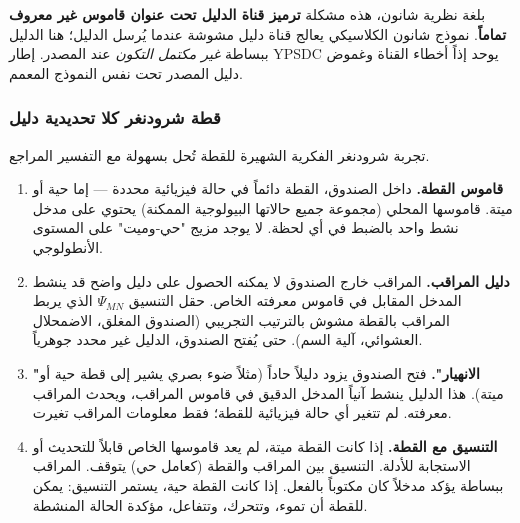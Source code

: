 \documentclass[12pt,a4paper]{article}
\theoremstyle{remark}
\begin{document}
	بلغة نظرية شانون، هذه مشكلة \textbf{ترميز قناة الدليل تحت عنوان قاموس غير معروف تماماً}. نموذج شانون الكلاسيكي يعالج قناة دليل مشوشة عندما يُرسل الدليل؛ هنا الدليل ببساطة \emph{غير مكتمل التكون} عند المصدر. إطار YPSDC يوحد إذاً أخطاء القناة وغموض دليل المصدر تحت نفس النموذج المعمم.
	
	\medskip
	
	\subsubsection{قطة شرودنغر كلا تحديدية دليل}
	
	تجربة شرودنغر الفكرية الشهيرة للقطة تُحل بسهولة مع التفسير المراجع.
	
	\begin{enumerate}[leftmargin=*]
		\item \textbf{قاموس القطة.} داخل الصندوق، القطة دائماً في حالة فيزيائية محددة — إما حية أو ميتة. قاموسها المحلي (مجموعة جميع حالاتها البيولوجية الممكنة) يحتوي على مدخل نشط واحد بالضبط في أي لحظة. لا يوجد مزيج "حي‑وميت" على المستوى الأنطولوجي.
		
		\item \textbf{دليل المراقب.} المراقب خارج الصندوق لا يمكنه الحصول على دليل واضح قد ينشط المدخل المقابل في قاموس معرفته الخاص. حقل التنسيق \(\Psi_{MN}\) الذي يربط المراقب بالقطة مشوش بالترتيب التجريبي (الصندوق المغلق، الاضمحلال العشوائي، آلية السم). حتى يُفتح الصندوق، الدليل غير محدد جوهرياً.
		
		\item \textbf{"الانهيار".} فتح الصندوق يزود دليلاً حاداً (مثلاً ضوء بصري يشير إلى قطة حية أو ميتة). هذا الدليل ينشط آنياً المدخل الدقيق في قاموس المراقب، ويحدث المراقب معرفته. لم تتغير أي حالة فيزيائية للقطة؛ فقط معلومات المراقب تغيرت.
		
		\item \textbf{التنسيق مع القطة.} إذا كانت القطة ميتة، لم يعد قاموسها الخاص قابلاً للتحديث أو الاستجابة للأدلة. التنسيق بين المراقب والقطة (كعامل حي) يتوقف. المراقب ببساطة يؤكد مدخلاً كان مكتوباً بالفعل. إذا كانت القطة حية، يستمر التنسيق: يمكن للقطة أن تموء، وتتحرك، وتتفاعل، مؤكدة الحالة المنشطة.
	\end{enumerate}
	
\end{document}
